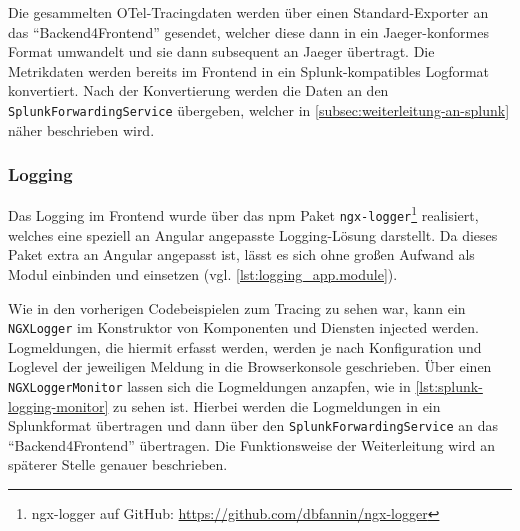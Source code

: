 
Die gesammelten OTel-Tracingdaten werden über einen Standard-Exporter an das \enquote{Backend4Frontend} gesendet, welcher diese dann in ein Jaeger-konformes Format umwandelt und sie dann subsequent an Jaeger übertragt. Die Metrikdaten werden bereits im Frontend in ein Splunk-kompatibles Logformat konvertiert. Nach der Konvertierung werden die Daten an den \texttt{SplunkForwardingService} übergeben, welcher in \autoref{subsec:weiterleitung-an-splunk} näher beschrieben wird.

\subsubsection{Logging}

Das Logging im Frontend wurde über das npm \cite{NPM} Paket \texttt{ngx-logger}\footnote{ngx-logger auf GitHub: \url{https://github.com/dbfannin/ngx-logger}} realisiert, welches eine speziell an Angular angepasste Logging-Lösung darstellt. Da dieses Paket extra an Angular angepasst ist, lässt es sich ohne großen Aufwand als Modul einbinden und einsetzen (vgl. \autoref{lst:logging_app.module}).



Wie in den vorherigen Codebeispielen zum Tracing zu sehen war, kann ein \texttt{NGXLogger} im Konstruktor von Komponenten und Diensten injected werden. Logmeldungen, die hiermit erfasst werden, werden je nach Konfiguration und Loglevel der jeweiligen Meldung in die Browserkonsole geschrieben. Über einen \texttt{NGXLoggerMonitor} lassen sich die Logmeldungen anzapfen, wie in \autoref{lst:splunk-logging-monitor} zu sehen ist. Hierbei werden die Logmeldungen in ein Splunkformat übertragen und dann über den \texttt{SplunkForwardingService} an das \enquote{Backend4Frontend} übertragen. Die Funktionsweise der Weiterleitung wird an späterer Stelle genauer beschrieben.



